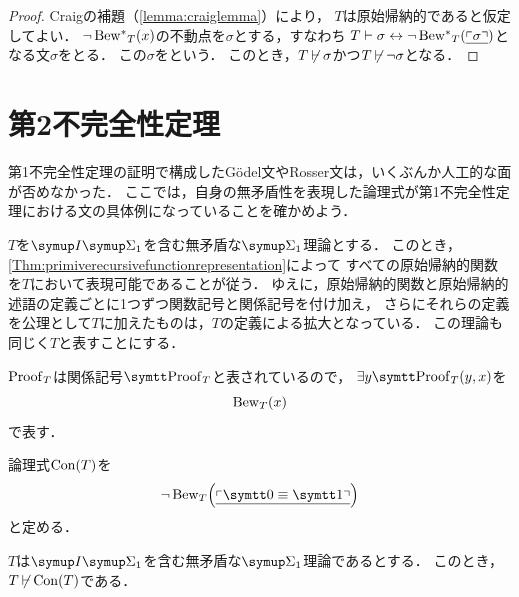
\begin{proof}
	Craigの補題（\cref{lemma:craiglemma}）により，
	\(T\)は原始帰納的であると仮定してよい．
	\(\lnot \apply{\Bewstar_T}{x}\)の不動点を\(\sigma\)とする，すなわち
	\(T \provable \sigma \formulaequiv \lnot \apply{\Bewstar_T}{\numeral{\GodelNumber{\sigma}}}\)となる文\(\sigma\)をとる．
	この\(\sigma\)をという．
	このとき，\(T \mathbin{\not\vdash} \sigma\)かつ\(T \mathbin{\not\vdash} \lnot \sigma\)となる．
\end{proof}


\section{第2不完全性定理} \label{sec:secondimcompletetheorem}

第1不完全性定理の証明で構成したGödel文やRosser文は，いくぶんか人工的な面が否めなかった．
ここでは，自身の無矛盾性を表現した論理式が第1不完全性定理における文の具体例になっていることを確かめよう．

\begin{Def} \label{Def:objbew}
	\(T\)を\(\SigmaFormulaInduction_1\)を含む無矛盾な\(\SigmaFormula_1\)理論とする．
	このとき，\cref{Thm:primiverecursivefunctionrepresentation}によって
	すべての原始帰納的関数を\(T\)において表現可能であることが従う．
	ゆえに，原始帰納的関数と原始帰納的述語の定義ごとに1つずつ関数記号と関係記号を付け加え，
	さらにそれらの定義を公理として\(T\)に加えたものは，\(T\)の定義による拡大となっている．
	この理論も同じく\(T\)と表すことにする．

	\(\operatorname{Proof}_T\)は関係記号\(\obj{\ProofPredicate}_T\)と表されているので，
	\(\exists y \apply{\obj{\ProofPredicate}_T}{y, x}\)を
	\begin{equation}
		\apply{\Bew_T}{x}
		\label{eq:objbewt}
	\end{equation}
	で表す．
\end{Def}

\begin{Def} \label{Def:consistencyformula}
	論理式\(\apply{\Con}{T}\)を
	\begin{equation}
		\lnot \apply{\Bew_T}{\numeral{\GodelNumber{\obj{0} \objeq \obj{1}}}}
		\label{eq:consistencyformula}
	\end{equation}
	と定める．
\end{Def}

\begin{Thm}[第2不完全性定理] \label{thm:secondimcompletetheorem}
	\(T\)は\(\SigmaFormulaInduction_1\)を含む無矛盾な\(\SigmaFormula_1\)理論であるとする．
	このとき，\(T \notprovable \apply{\Con}{T}\)である．
\end{Thm}